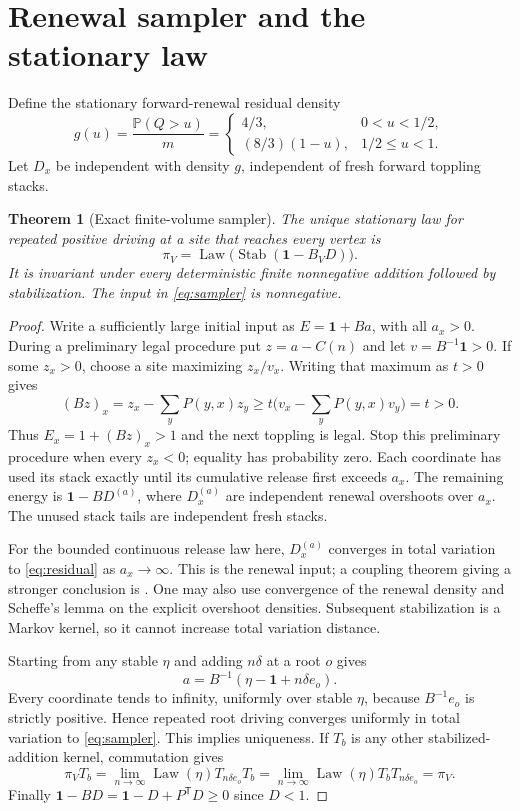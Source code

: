 \documentclass[11pt]{article}
\numberwithin{equation}{section}
\newtheorem{theorem}{Theorem}[section]
\theoremstyle{definition}
\newcommand{\Prob}{\mathbb P}
\newcommand{\ind}{\mathbf 1}
\newcommand{\Stab}{\operatorname{Stab}}
\newcommand{\Law}{\operatorname{Law}}
\begin{document}
\section{Renewal sampler and the stationary law}\label{sec:sampler}

Define the stationary forward-renewal residual density
\begin{equation}\label{eq:residual}
 g(u)=\frac{\Prob(Q>u)}m
 =\begin{cases}4/3,&0<u<1/2,\\(8/3)(1-u),&1/2\le u<1.\end{cases}
\end{equation}
Let $D_x$ be independent with density $g$, independent of fresh forward toppling stacks.

\begin{theorem}[Exact finite-volume sampler]\label{thm:sampler}
The unique stationary law for repeated positive driving at a site that reaches every vertex is
\begin{equation}\label{eq:sampler}
 \pi_V=\Law\bigl(\Stab(\ind-B_VD)\bigr).
\end{equation}
It is invariant under every deterministic finite nonnegative addition followed by stabilization. The input in \eqref{eq:sampler} is nonnegative.
\end{theorem}
\begin{proof}
Write a sufficiently large initial input as $E=\ind+Ba$, with all $a_x>0$. During a preliminary legal procedure put $z=a-C(n)$ and let $v=B^{-1}\ind>0$. If some $z_x>0$, choose a site maximizing $z_x/v_x$. Writing that maximum as $t>0$ gives
\[
 (Bz)_x=z_x-\sum_yP(y,x)z_y
 \ge t\bigl(v_x-\sum_yP(y,x)v_y\bigr)=t>0.
\]
Thus $E_x=1+(Bz)_x>1$ and the next toppling is legal. Stop this preliminary procedure when every $z_x<0$; equality has probability zero. Each coordinate has used its stack exactly until its cumulative release first exceeds $a_x$. The remaining energy is $\ind-BD^{(a)}$, where $D_x^{(a)}$ are independent renewal overshoots over $a_x$. The unused stack tails are independent fresh stacks.

For the bounded continuous release law here, $D_x^{(a)}$ converges in total variation to \eqref{eq:residual} as $a_x\to\infty$. This is the renewal input; a coupling theorem giving a stronger conclusion is \cite{BCF}. One may also use convergence of the renewal density and Scheffe's lemma on the explicit overshoot densities. Subsequent stabilization is a Markov kernel, so it cannot increase total variation distance.

Starting from any stable $\eta$ and adding $n\delta$ at a root $o$ gives
\[
 a=B^{-1}(\eta-\ind+n\delta e_o).
\]
Every coordinate tends to infinity, uniformly over stable $\eta$, because $B^{-1}e_o$ is strictly positive. Hence repeated root driving converges uniformly in total variation to \eqref{eq:sampler}. This implies uniqueness. If $T_b$ is any other stabilized-addition kernel, commutation gives
\[
 \pi_VT_b=\lim_{n\to\infty}\Law(\eta)T_{n\delta e_o}T_b
 =\lim_{n\to\infty}\Law(\eta)T_bT_{n\delta e_o}=\pi_V.
\]
Finally $\ind-BD=\ind-D+P^{\mathsf T}D\ge0$ since $D<1$.
\end{proof}
\end{document}
